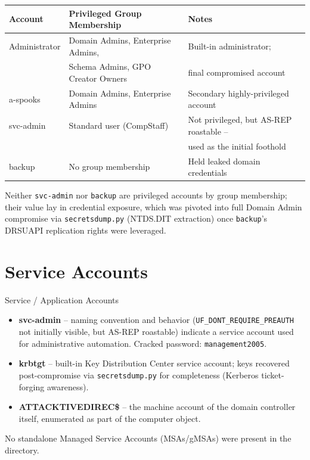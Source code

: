 \documentclass[11pt]{article}
\begin{document}
\begin{center}
\begin{tabular}{@{}lll}
\toprule
\textbf{Account} & \textbf{Privileged Group Membership} & \textbf{Notes} \\
\midrule
Administrator & Domain Admins, Enterprise Admins, & Built-in administrator; \\
 & Schema Admins, GPO Creator Owners & final compromised account \\
a-spooks & Domain Admins, Enterprise Admins & Secondary highly-privileged account \\
svc-admin & Standard user (CompStaff) & Not privileged, but AS-REP roastable -- \\
 & & used as the initial foothold \\
backup & No group membership & Held leaked domain credentials \\
\bottomrule
\end{tabular}
\end{center}

Neither \texttt{svc-admin} nor \texttt{backup} are privileged accounts by group
membership; their value lay in credential exposure, which was pivoted into full
Domain Admin compromise via \texttt{secretsdump.py} (NTDS.DIT extraction) once
\texttt{backup}'s DRSUAPI replication rights were leveraged.

\section{Service Accounts}
\begin{sectionbox}{Service / Application Accounts}
\begin{itemize}[leftmargin=1.2em]
  \item \textbf{svc-admin} -- naming convention and behavior (\texttt{UF\_DONT\_REQUIRE\_PREAUTH}
        not initially visible, but AS-REP roastable) indicate a service account used for
        administrative automation. Cracked password: \texttt{management2005}.
  \item \textbf{krbtgt} -- built-in Key Distribution Center service account; keys
        recovered post-compromise via \texttt{secretsdump.py} for completeness
        (Kerberos ticket-forging awareness).
  \item \textbf{ATTACKTIVEDIREC\$} -- the machine account of the domain controller
        itself, enumerated as part of the computer object.
\end{itemize}
No standalone Managed Service Accounts (MSAs/gMSAs) were present in the directory.
\end{sectionbox}
\end{document}
